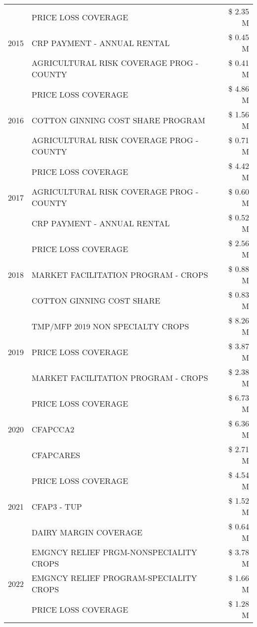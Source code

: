 \begin{tabular}{llr}
\cline{1-3}
\multirow[t]{3}{*}{2015} & PRICE LOSS COVERAGE & \$ 2.35 M \\
 & CRP PAYMENT - ANNUAL RENTAL & \$ 0.45 M \\
 & AGRICULTURAL RISK COVERAGE PROG - COUNTY & \$ 0.41 M \\
\cline{1-3}
\multirow[t]{3}{*}{2016} & PRICE LOSS COVERAGE & \$ 4.86 M \\
 & COTTON GINNING COST SHARE PROGRAM & \$ 1.56 M \\
 & AGRICULTURAL RISK COVERAGE PROG - COUNTY & \$ 0.71 M \\
\cline{1-3}
\multirow[t]{3}{*}{2017} & PRICE LOSS COVERAGE & \$ 4.42 M \\
 & AGRICULTURAL RISK COVERAGE PROG - COUNTY & \$ 0.60 M \\
 & CRP PAYMENT - ANNUAL RENTAL & \$ 0.52 M \\
\cline{1-3}
\multirow[t]{3}{*}{2018} & PRICE LOSS COVERAGE & \$ 2.56 M \\
 & MARKET FACILITATION PROGRAM - CROPS & \$ 0.88 M \\
 & COTTON GINNING COST SHARE & \$ 0.83 M \\
\cline{1-3}
\multirow[t]{3}{*}{2019} & TMP/MFP 2019 NON SPECIALTY CROPS & \$ 8.26 M \\
 & PRICE LOSS COVERAGE & \$ 3.87 M \\
 & MARKET FACILITATION PROGRAM - CROPS & \$ 2.38 M \\
\cline{1-3}
\multirow[t]{3}{*}{2020} & PRICE LOSS COVERAGE & \$ 6.73 M \\
 & CFAPCCA2 & \$ 6.36 M \\
 & CFAPCARES & \$ 2.71 M \\
\cline{1-3}
\multirow[t]{3}{*}{2021} & PRICE LOSS COVERAGE & \$ 4.54 M \\
 & CFAP3 - TUP & \$ 1.52 M \\
 & DAIRY MARGIN COVERAGE & \$ 0.64 M \\
\cline{1-3}
\multirow[t]{3}{*}{2022} & EMGNCY RELIEF PRGM-NONSPECIALITY CROPS & \$ 3.78 M \\
 & EMGNCY RELIEF PROGRAM-SPECIALITY CROPS & \$ 1.66 M \\
 & PRICE LOSS COVERAGE & \$ 1.28 M \\
\cline{1-3}
\bottomrule
\end{tabular}
